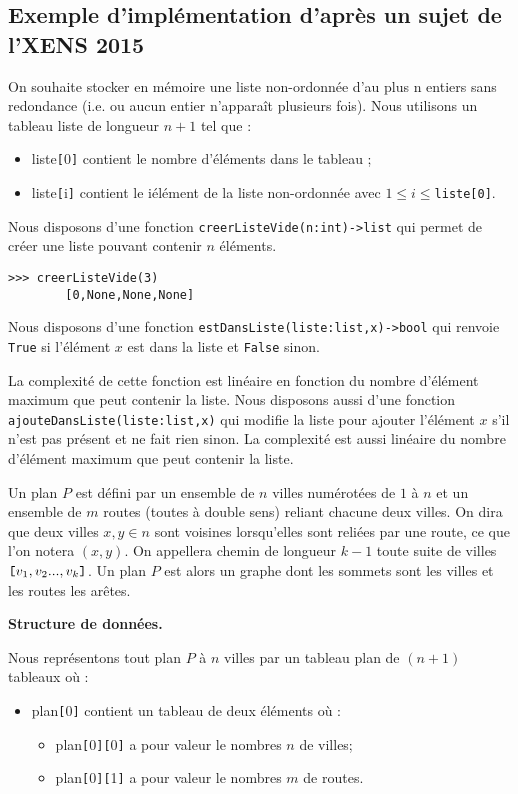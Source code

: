 \subsection{Exemple d'implémentation d'après un sujet de l'XENS 2015}
On souhaite stocker en mémoire une liste non-ordonnée d'au plus n entiers sans redondance (i.e. ou aucun entier n'apparaît
plusieurs fois). Nous utilisons un tableau 
liste de longueur $n+1$ tel que :
\begin{itemize}
\item liste\verb![!0\verb!]! contient le nombre d'éléments dans le tableau ;
\item liste\verb![!i\verb!]! contient le i\ieme élément de la liste non-ordonnée avec $1\leqslant i \leqslant $\texttt{liste[0]}.
\end{itemize}
Nous disposons d'une fonction \texttt{creerListeVide(n:int)->list} qui permet de créer une liste pouvant contenir $n$ éléments.

\begin{lstlisting}
>>> creerListeVide(3)
        [0,None,None,None]
\end{lstlisting}

Nous disposons d'une fonction \texttt{estDansListe(liste:list,x)->bool} qui renvoie \texttt{True} si l'élément $x$ est dans la liste et \texttt{False} sinon.

La complexité de cette fonction est linéaire en fonction du nombre d'élément maximum que peut contenir la liste. 
Nous disposons aussi d'une fonction \texttt{ajouteDansListe(liste:list,x)} qui modifie la liste pour ajouter l'élément $x$ s'il n'est pas présent et ne fait rien sinon. La complexité est aussi linéaire du nombre d'élément maximum que peut contenir la liste.

Un plan $P$ est défini par un ensemble de $n$ villes numérotées de $1$ à $n$ et un ensemble de $m$ routes (toutes à double sens)
reliant chacune deux villes. On dira que deux villes $x, y \in  n$ sont voisines lorsqu'elles sont reliées par une route, ce que l'on notera $(x, y)$. On appellera chemin de longueur $k-1$ toute suite de villes $\verb![!v_1, v_2 ... , v_k\verb!]!$. Un plan $P$ est alors un graphe dont les sommets sont les villes et les routes les arêtes.

\textbf{Structure de données. } 

Nous représentons tout plan $P$ à $n$ villes par un tableau plan de $(n+1)$ tableaux où :
\begin{itemize}
\item plan\verb![!0\verb!]! contient un tableau de deux éléments où :
\begin{itemize}
\item plan\verb![!0\verb!]!\verb![!0\verb!]! a pour valeur le nombres $n$ de villes;
\item plan\verb![!0\verb!]!\verb![!1\verb!]! a pour valeur le nombres $m$ de routes.
\end{itemize}
\end{itemize}


